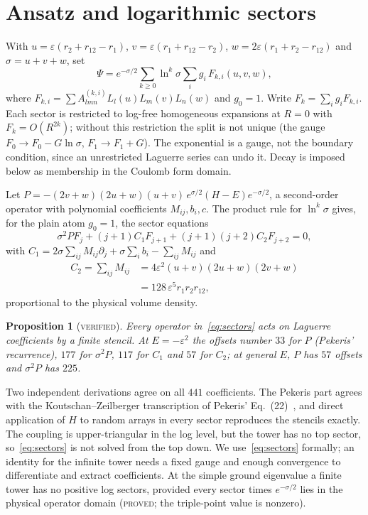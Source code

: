\documentclass[aps,pra,twocolumn,superscriptaddress,nofootinbib]{revtex4-2}
\newtheorem{proposition}[theorem]{Proposition}
\theoremstyle{remark}
\newcommand{\lab}[1]{\textup{\textsc{#1}}}
\begin{document}
\section{Ansatz and logarithmic sectors}
With $u=\varepsilon(r_2+r_{12}-r_1)$, $v=\varepsilon(r_1+r_{12}-r_2)$, $w=2\varepsilon(r_1+r_2-r_{12})$ and $\sigma=u+v+w$, set
\begin{equation}\label{eq:ansatz}
\Psi=e^{-\sigma/2}\sum_{k\ge0}\ln^k\sigma\sum_i g_i\,F_{k,i}(u,v,w),
\end{equation}
where $F_{k,i}=\sum A^{(k,i)}_{lmn}L_l(u)L_m(v)L_n(w)$ and $g_0=1$.
Write $F_k=\sum_ig_iF_{k,i}$.
Each sector is restricted to log-free homogeneous expansions at $R=0$ with $F_k=O(R^{2k})$; without this restriction the split is not unique (the gauge $F_0\to F_0-G\ln\sigma$, $F_1\to F_1+G$).
The exponential is a gauge, not the boundary condition, since an unrestricted Laguerre series can undo it.
Decay is imposed below as membership in the Coulomb form domain.

Let $P=-(2v+w)(2u+w)(u+v)\,e^{\sigma/2}(H-E)e^{-\sigma/2}$, a second-order operator with polynomial coefficients $M_{ij},b_i,c$.
The product rule for $\ln^k\sigma$ gives, for the plain atom $g_0=1$, the sector equations
\begin{equation}\label{eq:sectors}
\sigma^2PF_j+(j+1)C_1F_{j+1}+(j+1)(j+2)C_2F_{j+2}=0,
\end{equation}
with $C_1=2\sigma\sum_{ij}M_{ij}\partial_j+\sigma\sum_ib_i-\sum_{ij}M_{ij}$ and
\begin{equation}
\begin{split}
C_2=\sum_{ij}M_{ij}&=4\varepsilon^2(u+v)(2u+w)(2v+w)\\&=128\,\varepsilon^5r_1r_2r_{12},
\end{split}
\end{equation}
proportional to the physical volume density.
\begin{proposition}[\lab{verified}]\label{prop:sectors}
Every operator in~\eqref{eq:sectors} acts on Laguerre coefficients by a finite stencil.
At $E=-\varepsilon^2$ the offsets number $33$ for $P$ (Pekeris' recurrence), $177$ for $\sigma^2P$, $117$ for $C_1$ and $57$ for $C_2$; at general $E$, $P$ has $57$ offsets and $\sigma^2P$ has $225$.
\end{proposition}
\noindent
Two independent derivations agree on all $441$ coefficients.
The Pekeris part agrees with the Koutschan--Zeilberger transcription of Pekeris' Eq.~(22)~\cite{KZ2011}, and direct application of $H$ to random arrays in every sector reproduces the stencils exactly.
The coupling is upper-triangular in the log level, but the tower has no top sector, so~\eqref{eq:sectors} is not solved from the top down.
We use~\eqref{eq:sectors} formally; an identity for the infinite tower needs a fixed gauge and enough convergence to differentiate and extract coefficients.
At the simple ground eigenvalue a finite tower has no positive log sectors, provided every sector times $e^{-\sigma/2}$ lies in the physical operator domain (\lab{proved}; the triple-point value is nonzero).
\end{document}
